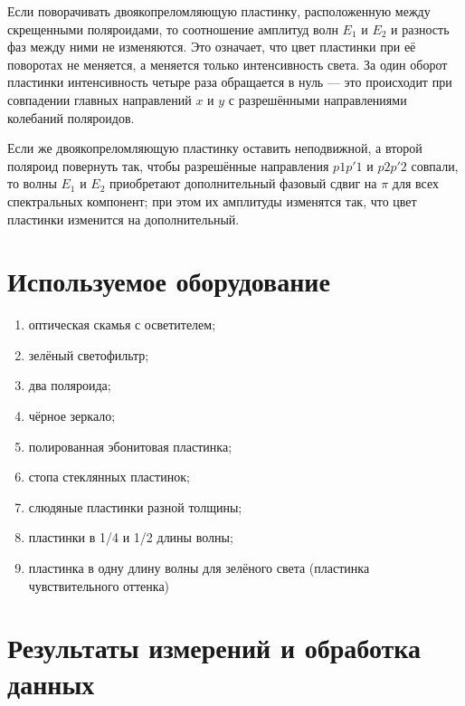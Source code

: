 \documentclass[a4paper, 12pt]{article}
\begin{document}
Если поворачивать двоякопреломляющую пластинку, расположенную между
скрещенными поляроидами, то соотношение амплитуд волн $ E_1 $ и $ E_2 $ и разность фаз между ними не изменяются. Это означает, что цвет пластинки при её поворотах не меняется, а меняется только интенсивность света. За один оборот пластинки интенсивность четыре раза обращается в нуль --- это происходит при совпадении главных направлений
$ x $ и $ y $ с разрешёнными направлениями колебаний поляроидов.

Если же двоякопреломляющую пластинку оставить неподвижной, а
второй поляроид повернуть так, чтобы разрешённые направления $ p1p'1 $
и $ p2p'2 $ совпали, то волны $ E_1 $ и $ E_2 $ приобретают дополнительный фазовый сдвиг на $ \pi $ для всех спектральных компонент; при этом их амплитуды изменятся так, что цвет пластинки изменится на дополнительный. 


\section{Используемое оборудование}

\begin{enumerate}
    \item оптическая скамья с осветителем;
    \item зелёный светофильтр;
    \item два поляроида;
    \item чёрное зеркало;
    \item полированная эбонитовая пластинка;
    \item стопа стеклянных пластинок;
    \item слюдяные пластинки разной толщины;
    \item пластинки в 1/4 и 1/2 длины волны;
    \item пластинка в одну длину волны для зелёного света (пластинка чувствительного оттенка)
\end{enumerate}

\section{Результаты измерений и обработка данных}

\end{document}
